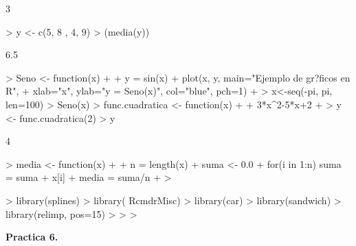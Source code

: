 \documentclass{article}
\begin{document}
\begin{Schunk}
\begin{Soutput}
[1] 3
\end{Soutput}
\begin{Sinput}
> y <- c(5, 8 , 4, 9)
> (media(y))
\end{Sinput}
\begin{Soutput}
[1] 6.5
\end{Soutput}
\begin{Sinput}
> Seno <- function(x)
+ {
+ y = sin(x)
+ plot(x, y, main="Ejemplo de gr?ficos en R",
+ xlab="x", ylab="y = Seno(x)", col="blue", pch=1)
+ }
> x<-seq(-pi, pi, len=100)
> Seno(x)
> func.cuadratica <- function(x)
+ {
+ 3*x^2-5*x+2
+ }
> y <- func.cuadratica(2)
> y
\end{Sinput}
\begin{Soutput}
[1] 4
\end{Soutput}
\begin{Sinput}
> media <- function(x)
+ {
+ n = length(x)
+ suma <- 0.0
+ for(i in 1:n) suma = suma + x[i]
+ media = suma/n
+ }
> 
\end{Sinput}
\end{Schunk}
\begin{Schunk}
\begin{Sinput}
> library(splines)
> library( RcmdrMisc)
> library(car)
> library(sandwich)
> library(relimp, pos=15)
> 
> 
> 
\end{Sinput}
\end{Schunk}

  
\textbf{Practica 6.}
\end{document}
